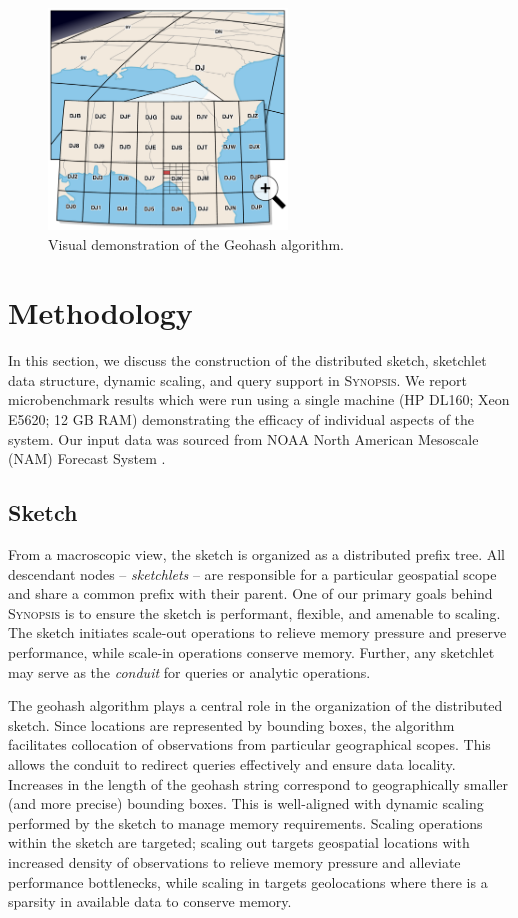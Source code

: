 \documentclass[9pt,journal,compsoc]{IEEEtran}
\begin{document}
\begin{figure}[h!]
    \centerline{\includegraphics[width=2.5in]{figures/geohash.pdf}}
    \caption{Visual demonstration of the Geohash algorithm.}
    \label{fig:geohash}
\end{figure}
%
%
\section{Methodology}
\label{sec:methodology}
In this section, we discuss the construction of the distributed sketch, sketchlet data structure, dynamic scaling, and query support in \textsc{Synopsis}. We report microbenchmark results which were run using a single machine (HP DL160; Xeon E5620; 12 GB RAM) demonstrating the efficacy of individual aspects of the system. Our input data was sourced from NOAA North American Mesoscale (NAM) Forecast System \cite{noaa_nam}.

\subsection{Sketch}
From a macroscopic view, the sketch is organized as a distributed prefix tree. All descendant nodes -- \emph{sketchlets} -- are responsible for a particular geospatial scope and share a common prefix with their parent. One of our primary goals behind \textsc{Synopsis} is to ensure the sketch is performant, flexible, and amenable to scaling. The sketch initiates scale-out operations to relieve memory pressure and preserve performance, while scale-in operations conserve memory. Further, any sketchlet may serve as the \emph{conduit} for queries or analytic operations.

The geohash algorithm plays a central role in the organization of the distributed sketch. Since locations are represented by bounding boxes, the algorithm facilitates collocation of observations from particular geographical scopes. This allows the conduit to redirect queries effectively and ensure data locality. Increases in the length of the geohash string correspond to geographically smaller (and more precise) bounding boxes. This is well-aligned with dynamic scaling performed by the sketch to manage memory requirements. Scaling operations within the sketch are targeted; scaling out targets geospatial locations with increased density of observations to relieve memory pressure and alleviate performance bottlenecks, while scaling in targets geolocations where there is a sparsity in available data to conserve memory.
\end{document}
